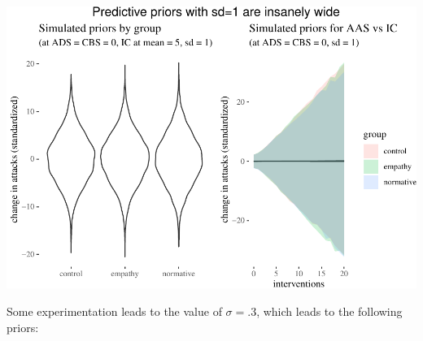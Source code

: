 \documentclass[10pt,dvipsnames,enabledeprecatedfontcommands]{scrartcl}
\begin{document}
\begin{center}\includegraphics[width=1\linewidth]{bayesianReport3_files/figure-latex/priors1-1} \end{center}

\normalsize

Some experimentation leads to the value of \(\sigma =.3\), which leads
to the following priors:

\vspace{1mm} \footnotesize
\end{document}
